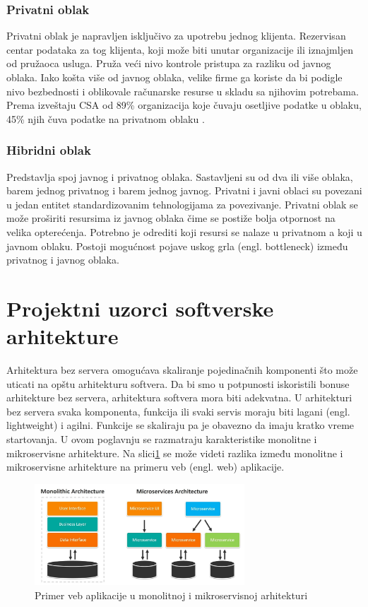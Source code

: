 \documentclass[12pt,oneside]{memoir}
\begin{document}
 
\subsubsection{Privatni oblak}
Privatni oblak je napravljen isključivo za upotrebu jednog klijenta. Rezervisan centar podataka za tog klijenta, koji može biti unutar organizacije ili iznajmljen od pružaoca usluga. Pruža veći nivo kontrole pristupa za razliku od javnog oblaka. Iako košta više od javnog oblaka, velike firme ga koriste da bi podigle nivo bezbednosti i oblikovale računarske resurse u skladu sa njihovim potrebama. Prema izveštaju CSA od 89\% organizacija koje čuvaju osetljive podatke u oblaku, 45\% njih čuva podatke na privatnom oblaku \cite{csa}.
 
\subsubsection{Hibridni oblak}
Predstavlja spoj javnog i privatnog oblaka. Sastavljeni su od dva ili više oblaka, barem jednog privatnog i barem jednog javnog. Privatni i javni oblaci su povezani u jedan entitet standardizovanim tehnologijama za povezivanje. Privatni oblak se može proširiti resursima iz javnog oblaka čime se postiže bolja otpornost na velika opterećenja. Potrebno je odrediti koji resursi se nalaze u privatnom a koji u javnom oblaku. Postoji mogućnost pojave uskog grla (engl. bottleneck) između privatnog i javnog oblaka.


\section{Projektni uzorci softverske arhitekture}
Arhitektura bez servera omogućava skaliranje pojedinačnih komponenti što može uticati na opštu arhitekturu softvera. Da bi smo u potpunosti iskoristili bonuse arhitekture bez servera, arhitektura softvera mora biti adekvatna. U arhitekturi bez servera svaka komponenta, funkcija ili svaki servis moraju biti lagani (engl. lightweight) i agilni. Funkcije se skaliraju pa je obavezno da imaju kratko vreme startovanja. U ovom poglavnju se razmatraju karakteristike monolitne i mikroservisne arhitekture. Na slici\ref{fig:arhitekturniProjektniUzorci} se može videti razlika između monolitne i mikroservisne arhitekture na primeru veb (engl. web) aplikacije.

\begin{figure}[!ht]
  \centering
  \includegraphics[width=0.7\textwidth]{Slika 6.jpg}
  \caption{Primer veb aplikacije u monolitnoj i mikroservisnoj arhitekturi}
  \label{fig:arhitekturniProjektniUzorci}
\end{figure}
\end{document}
